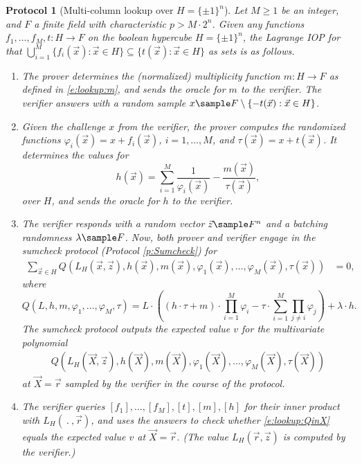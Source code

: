 \documentclass[11pt]{article}
\newtheorem{protocol}[]{Protocol}
\theoremstyle{definition}
\theoremstyle{remark}
\begin{document}
\begin{protocol}[Multi-column lookup over $H=\{\pm 1\}^n$]
\label{prot:lookup}
Let $M\geq 1$ be an integer, and $F$ a finite field with characteristic $p > M\cdot 2^n$. 
Given any functions $f_1, \ldots, f_M, t :H\rightarrow F$ on the boolean hypercube $H=\{\pm 1\}^n$, the Lagrange IOP for that $\bigcup_{i=1}^M\{f_i(\vec x) : \vec x\in H\}\subseteq \{t(\vec x) : \vec x\in H\}$ as sets is as follows.
\begin{enumerate} 
\item
The prover determines the (normalized) multiplicity function $m:H\rightarrow F$ as defined in \eqref{e:lookup:m},
and sends the oracle for $m$ to the verifier.
The verifier answers with a random sample $x\sample F\setminus \{- t(\vec x) : \vec x\in H\}$. 

\item
\label{i:lookup:step1}
Given the challenge $x$ from the verifier, the prover computes the randomized functions $\varphi_i(\vec x) = x + f_i(\vec x)$, $i=1,\ldots, M$, and $\tau(\vec x) =  x + t(\vec x)$.
It determines the values for
\begin{equation}
\label{e:lookup:h:phi}
h(\vec x) = \sum_{i=1}^M \frac{1}{\varphi_i(\vec x)} - \frac{m(\vec x)}{\tau(\vec x)},
\end{equation}
over $H$, and sends the oracle for $h$ to the verifier.

\item
\label{i:lookup:step2}
The verifier responds with a random vector $\vec z \sample F^n$ and a batching randomness $\lambda\sample F$.
Now, both prover and verifier engage in the sumcheck protocol (Protocol \ref{p:Sumcheck}) for 
\begin{align*} 
\sum_{\vec x \in H} Q(L_H(\vec x, \vec z),  h(\vec x), m(\vec x),  \varphi_1(\vec x), \ldots, \varphi_M(\vec x),  \tau(\vec x))&= 0,
\end{align*}
where %
\begin{equation}
\label{e:lookup:Q}
Q(L,h,m, \varphi_1,\ldots, \varphi_M,  \tau) =   
L \cdot \left((h \cdot \tau + m) \cdot \prod_{i=1}^M \varphi_i - \tau\cdot \sum_{i=1}^M \prod_{j\neq i} \varphi_j\right)
+  \lambda \cdot h.
\end{equation}
The sumcheck protocol outputs the expected value $v$ for the multivariate polynomial 
\begin{equation}
\label{e:lookup:QinX}
\begin{aligned}
Q(L_H(\vec X, \vec z), h(\vec X), m(\vec X), \varphi_1(\vec X),\ldots, \varphi_M(\vec X),  \tau(\vec X))
\end{aligned}
\end{equation}
at $\vec X=\vec r$ sampled by the verifier in the course of the protocol.

\item
The verifier queries $[f_1], \ldots, [f_M], [t], [m], [h]$ for their inner product with $L_H(\:.\:,\vec r)$, and uses the answers 
to check whether \eqref{e:lookup:QinX} equals the expected value $v$ at $\vec X = \vec r$. 
(The value $L_H(\vec r, \vec z)$ is computed by the verifier.)
\end{enumerate}
\end{protocol}
\end{document}
